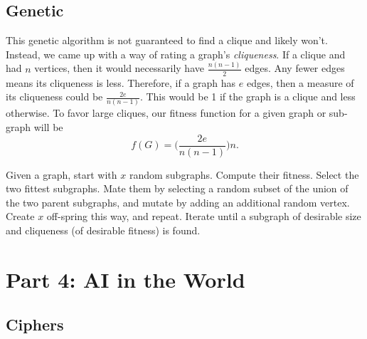 \documentclass[11pt]{amsart}
\begin{document}
\subsection*{Genetic}
This genetic algorithm is not guaranteed to find a clique and likely won't.
Instead, we came up with a way of rating a graph's \emph{cliqueness}. If a
clique and had $n$ vertices, then it would necessarily have $\frac{n(n-1)}{2}$
edges. Any fewer edges means its cliqueness is less. Therefore, if a graph has $e$
edges, then a measure of its cliqueness could be $\frac{2e}{n(n-1)}$. This would be 1 if
the graph is a clique and less otherwise. To favor large cliques, our fitness
function for a given graph or sub-graph will be
\[
f(G) = \Bigg(\frac{2e}{n(n-1)}\Bigg)n.
\]

Given a graph, start with $x$ random subgraphs. Compute their fitness.
Select the two fittest subgraphs. %
Mate them by selecting a random subset of the union of
the two parent subgraphs, and mutate by adding an additional random vertex.
Create $x$ off-spring this way, and repeat. Iterate until a subgraph of desirable
size and cliqueness (of desirable fitness) is found.


\section*{Part 4: AI in the World}

\subsection*{Ciphers}
\end{document}
